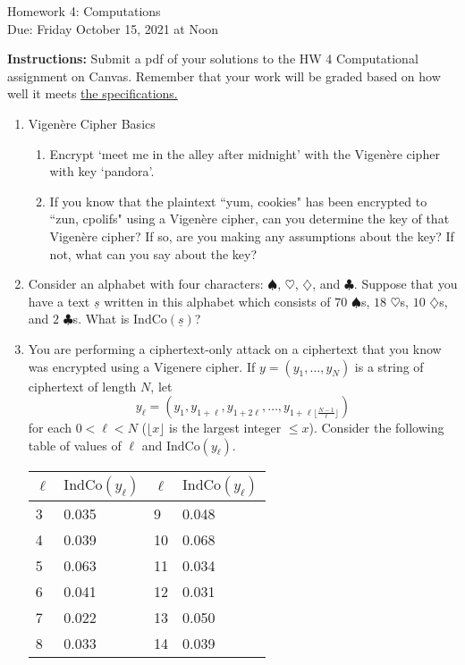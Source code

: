 \documentclass[10pt,a4paper]{article}
\begin{document}
\begin{center}
{\Large Homework 4: Computations}\\
Due: Friday October 15, 2021 at Noon\\


\end{center}
{\bf Instructions:} Submit a pdf of your solutions to the HW 4 Computational assignment on Canvas. Remember that your work will be graded based on how well it meets \href{https://docs.google.com/document/d/1emM06_WRh_h941rsjtRE9fRVndJtfRKd9gyS3Fs_rFA/edit?usp=sharing}{the specifications. }
\\[1em]


\begin{enumerate}

\item Vigen\`{e}re Cipher Basics
\begin{enumerate}
\item Encrypt `meet me in the alley after midnight' with the Vigen\`{e}re cipher with key `pandora'.
\item If you know that the plaintext ``yum, cookies" has been encrypted to ``zun, cpolifs" using a Vigen\`{e}re cipher, can you determine the key of that Vigen\`{e}re cipher? If so, are you making any assumptions about the key? If not, what can you say about the key? 
\end{enumerate}

\item Consider an alphabet with four characters: $\spadesuit$, $\heartsuit$, $\diamondsuit$, and $\clubsuit$.  Suppose that you have a text $\underline{s}$ written in this alphabet which consists of $70$ $\spadesuit$s,  $18$ $\heartsuit$s, $10$ $\diamondsuit$s, and $2$ $\clubsuit$s.  What is $\textrm{IndCo}(\underline{s})$?

\item  You are performing a ciphertext-only attack on a ciphertext that you know was encrypted using a Vigenere cipher.  If $y = (y_1, \ldots, y_{N})$ is a string of ciphertext of length $N$, let $$y_{\ell} = (y_1, y_{1+\ell}, y_{1+2\ell}, \ldots, y_{1+\ell\lfloor{\frac{N-1}{\ell}}\rfloor})$$ for each $0 < \ell <N$ ($\lfloor x \rfloor$ is the largest integer $\le x$).  Consider the following table of values of $\ell$ and $\mathrm{IndCo}(y_{\ell})$.

\begin{center}
    \begin{tabular}{ l | l | l | l }
    $\ell$ & $\mathrm{IndCo}(y_\ell)$ &  $\ell$ & $\mathrm{IndCo}(y_\ell)$  \\ 
    \hline
    3 & 0.035 & 9  & 0.048\\ 
    4 & 0.039 & 10 & 0.068  \\ 
    5 & 0.063 & 11 & 0.034  \\
    6 & 0.041  & 12 & 0.031  \\
    7 & 0.022  &  13 & 0.050\\
    8 & 0.033  &  14 & 0.039\\
    \end{tabular}
\end{center}


\end{enumerate}
\end{document}
